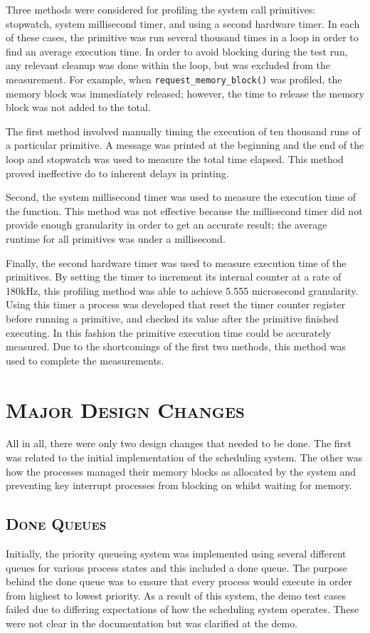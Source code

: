 \documentclass[oneside]{report}
\begin{document}
Three methods were considered for profiling the system call
primitives: stopwatch, system millisecond timer, and using a second
hardware timer. In each of these cases, the primitive was run several
thousand times in a loop in order to find an average execution
time. In order to avoid blocking during the test run, any relevant
cleanup was done within the loop, but was excluded from the
measurement. For example, when \texttt{request\_memory\_block()} was
profiled, the memory block was immediately released; however, the time
to release the memory block was not added to the total.

The first method involved manually timing the execution of ten
thousand runs of a particular primitive. A message was printed at the
beginning and the end of the loop and stopwatch was used to measure
the total time elapsed. This method proved ineffective do to inherent
delays in printing.

Second, the system millisecond timer was used to measure the execution
time of the function. This method was not effective because the
millisecond timer did not provide enough granularity in order to get
an accurate result; the average runtime for all primitives was under a
millisecond.

Finally, the second hardware timer was used to measure execution time
of the primitives. By setting the timer to increment its internal
counter at a rate of 180kHz, this profiling method was able to achieve
5.555 microsecond granularity. Using this timer a process was
developed that reset the timer counter register before running a
primitive, and checked its value after the primitive finished
executing. In this fashion the primitive execution time could be
accurately measured. Due to the shortcomings of the first two methods,
this method was used to complete the measurements.

\chapter{\textsc{Major Design Changes}}
All in all, there were only two design changes that needed to be done. The
first was related to the initial implementation of the scheduling system. The
other was how the processes managed their memory blocks as allocated by the
system and preventing key interrupt processes from blocking on whilst waiting
for memory.

\section{\textsc{Done Queues}}
Initially, the priority queueing system was implemented using several different
queues for various process states and this included a done queue. The purpose
behind the done queue was to ensure that every process would execute in order
from highest to lowest priority. As a result of this system, the demo test
cases failed due to differing expectations of how the scheduling system
operates. These were not clear in the documentation but was clarified at the
demo.
\end{document}
